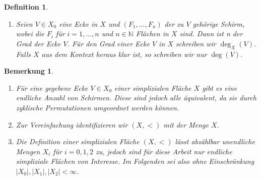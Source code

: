\documentclass[12pt,titlepage,twoside,cleardoublepage]{article}
\theoremstyle{nummermitklammern}
\newtheorem{definition}[temp]{Definition}
\newtheorem{bemerkung}[temp]{Bemerkung}
\newtheorem{definition}[zahl]{Definition}
\newtheorem{bemerkung}[zahl]{Bemerkung}
\numberwithin{equation}{section}
\begin{document}
\begin{definition}
\begin{enumerate}
\begin{figure}[H]
\begin{center}
\texttt{[image: Image\_Def14]}
\end{center}
\end{figure} 
 \item Seien $V \in X_0$ eine Ecke in $X$ und $(F_1,\ldots,F_n)$ der zu $V$ gehörige Schirm, wobei die $F_i$ für $i=1,\ldots ,n$ und $n\in \mathbb{N}$ Flächen in $X$ sind. Dann ist n der \emph{Grad der Ecke} $V$. Für den Grad einer Ecke $V$ in $X$ schreiben wir $\deg_X(V)$. Falls $X$ aus dem Kontext heraus klar ist, so schreiben wir nur $\deg(V)$.

\end{enumerate}
\end{definition}

\begin{bemerkung}
\begin{enumerate}
\item Für eine gegebene Ecke $V \in X_0$ einer simplizialen Fläche $X$ gibt es eine endliche Anzahl von Schirmen. Diese sind jedoch alle äquivalent, da sie durch zyklische Permutationen umgeordnet werden können.
\item Zur Vereinfachung identifizieren wir $(X,<)$ mit der Menge $X$. 
\item Die Definition einer simplizialen Fläche $(X,<)$ lässt abzählbar unendliche Mengen $X_i$ für $i=0,1,2$ zu, jedoch sind für diese Arbeit nur endliche simpliziale Flächen von Interesse. Im Folgenden sei also ohne Einschränkung $\vert X_0\vert,\vert X_1\vert,\vert X_2\vert < \infty$.
\end{enumerate}
\end{bemerkung}
 
\end{document}
